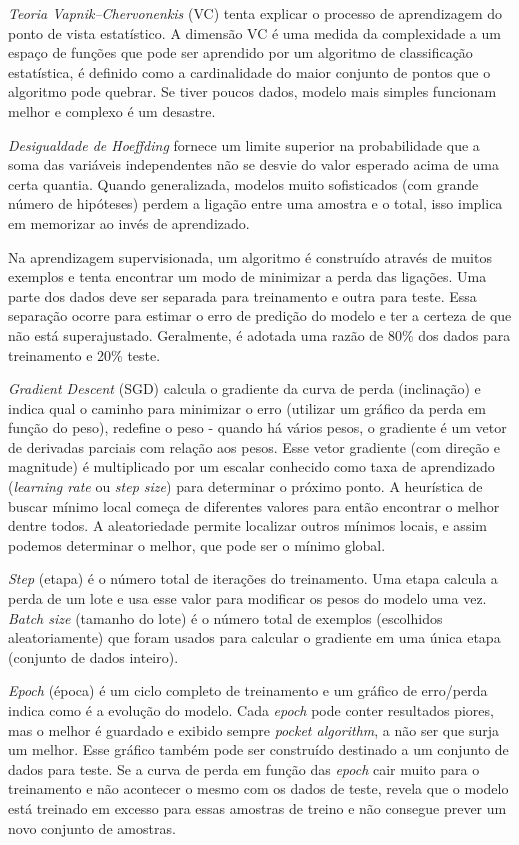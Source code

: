 \textit{Teoria Vapnik–Chervonenkis} (VC) tenta explicar o processo de aprendizagem do ponto de vista estatístico. A dimensão VC é uma medida da complexidade a um espaço de funções que pode ser aprendido por um algoritmo de classificação estatística, é definido como a cardinalidade do maior conjunto de pontos que o algoritmo pode quebrar. Se tiver poucos dados, modelo mais simples funcionam melhor e complexo é um desastre.

\textit{Desigualdade de Hoeffding} fornece um limite superior na probabilidade que a soma das variáveis independentes não se desvie do valor esperado acima de uma certa quantia. Quando generalizada, modelos muito sofisticados (com grande número de hipóteses) perdem a ligação entre uma amostra e o total, isso implica em memorizar ao invés de aprendizado.

Na aprendizagem supervisionada, um algoritmo é construído através de muitos exemplos e tenta encontrar um modo de minimizar a perda das ligações. Uma parte dos dados deve ser separada para treinamento e outra para teste. Essa separação ocorre para estimar o erro de predição do modelo e ter a certeza de que não está superajustado. Geralmente, é adotada uma razão de 80\% dos dados para treinamento e 20\% teste.

\textit{Gradient Descent} (SGD) calcula o gradiente da curva de perda (inclinação) e indica qual o caminho para minimizar o erro (utilizar um gráfico da perda em função do peso), redefine o peso - quando há vários pesos, o gradiente é um vetor de derivadas parciais com relação aos pesos. Esse vetor gradiente (com direção e magnitude) é multiplicado por um escalar conhecido como taxa de aprendizado (\textit{learning rate} ou \textit{step size}) para determinar o próximo ponto. A heurística de buscar mínimo local começa de diferentes valores para então encontrar o melhor dentre todos. A aleatoriedade permite localizar outros mínimos locais, e assim podemos determinar o melhor, que pode ser o mínimo global.

\textit{Step} (etapa) é o número total de iterações do treinamento. Uma etapa calcula a perda de um lote e usa esse valor para modificar os pesos do modelo uma vez. \textit{Batch size} (tamanho do lote) é o número total de exemplos (escolhidos aleatoriamente) que foram usados para calcular o gradiente em uma única etapa (conjunto de dados inteiro).

\textit{Epoch} (época) é um ciclo completo de treinamento e um gráfico de erro/perda indica como é a evolução do modelo. Cada \textit{epoch} pode conter resultados piores, mas o melhor é guardado e exibido sempre \textit{pocket algorithm}, a não ser que surja um melhor. Esse gráfico também pode ser construído destinado a um conjunto de dados para teste. Se a curva de perda em função das \textit{epoch} cair muito para o treinamento e não acontecer o mesmo com os dados de teste, revela que o modelo está treinado em excesso para essas amostras de treino e não consegue prever um novo conjunto de amostras.

